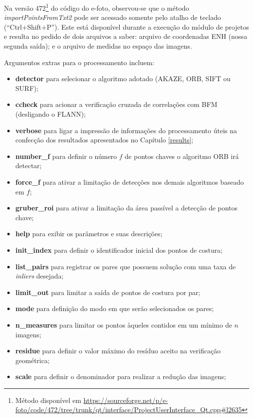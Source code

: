 Na versão 472\footnote{Método disponível em \url{https://sourceforge.net/p/e-foto/code/472/tree/trunk/qt/interface/ProjectUserInterface\_Qt.cpp\#l2635}} do código do e-foto, observou-se que o método \textit{importPointsFromTxt2} pode ser acessado somente pelo atalho de teclado (``Ctrl+Shift+P''). Este está disponível durante a execução do módulo de projetos e resulta no pedido de dois arquivos a saber: arquivo de coordenadas ENH (nossa segunda saída); e o arquivo de medidas no espaço das imagens.

Argumentos extras para o processamento incluem:

\begin{itemize}
    \item \textbf{detector} para selecionar o algoritmo adotado (AKAZE, ORB, SIFT ou SURF);
    \item \textbf{ccheck} para acionar a verificação cruzada de correlações com BFM (desligando o FLANN);
    \item \textbf{verbose} para ligar a impressão de informações do processamento úteis na confecção dos resultados apresentados no Capítulo \ref{results};
    \item \textbf{number\_f} para definir o número $f$ de pontos chaves o algoritmo ORB irá detectar;
    \item \textbf{force\_f} para ativar a limitação de detecções nos demais algoritmos baseado em $f$;
    \item \textbf{gruber\_roi} para ativar a limitação da área passível a detecção de pontos chave;
    \item \textbf{help} para exibir os parâmetros e suas descrições;
    \item \textbf{init\_index} para definir o identificador inicial dos pontos de costura;
    \item \textbf{list\_pairs} para registrar os pares que possuem solução com uma taxa de \textit{inliers} desejada;
    \item \textbf{limit\_out} para limitar a saída de pontos de costura por par;
    \item \textbf{mode} para definição do modo em que serão selecionados os pares;
    \item \textbf{n\_measures} para limitar os pontos àqueles contidos em um mínimo de $n$ imagens;
    \item \textbf{residue} para definir o valor máximo do resíduo aceito na verificação geométrica;
    \item \textbf{scale} para definir o denominador para realizar a redução das imagens;
\end{itemize}

